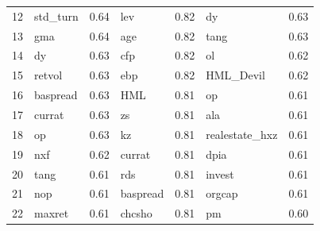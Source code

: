 \begin{footnotesize}
\begin{longtable}{rlc|lc|lc}
		12                        & std\_turn                   & 0.64                          & lev                         & 0.82                          & dy                                & 0.63           \\
		13                        & gma                         & 0.64                          & age                         & 0.82                          & tang                              & 0.63           \\
		14                        & dy                          & 0.63                          & cfp                         & 0.82                          & ol                                & 0.62           \\
		15                        & retvol                      & 0.63                          & ebp                         & 0.82                          & HML\_Devil                        & 0.62           \\
		16                        & baspread                    & 0.63                          & HML                         & 0.81                          & op                                & 0.61           \\
		17                        & currat                      & 0.63                          & zs                          & 0.81                          & ala                               & 0.61           \\
		18                        & op                          & 0.63                          & kz                          & 0.81                          & realestate\_hxz                   & 0.61           \\
		19                        & nxf                         & 0.62                          & currat                      & 0.81                          & dpia                              & 0.61           \\
		20                        & tang                        & 0.61                          & rds                         & 0.81                          & invest                            & 0.61           \\
		21                        & nop                         & 0.61                          & baspread                    & 0.81                          & orgcap                            & 0.61           \\
		22                        & maxret                      & 0.61                          & chcsho                      & 0.81                          & pm                                & 0.60           \\

\end{longtable}
\end{footnotesize}
